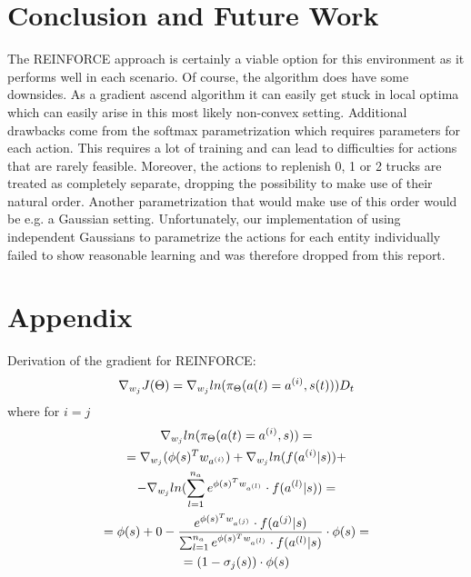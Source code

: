 \documentclass[journal, a4paper]{IEEEtran}
\theoremstyle{plain}
\theoremstyle{definition}
\begin{document}
\section{Conclusion and Future Work}
The REINFORCE approach is certainly a viable option for this environment as it performs well in each scenario. Of course, the algorithm does have some downsides. As a gradient ascend algorithm it can easily get stuck in local optima which can easily arise in this most likely non-convex setting. 
Additional drawbacks come from the softmax parametrization which 
requires parameters for each action. This requires a lot of training and can lead to difficulties for actions that are rarely feasible. Moreover, the actions to replenish 0, 1 or 2 trucks are treated as completely separate, dropping the possibility to make use of their natural order. Another parametrization that would make use of this order would be e.g. a Gaussian setting. 
Unfortunately, our implementation of using independent Gaussians to parametrize the actions for each entity individually failed to show reasonable learning and was therefore dropped from this report.



\section{Appendix}
Derivation of the gradient for REINFORCE:
\begin{align}
	\nabla_{w_j}J(\Theta) = 
\nabla_{w_j} ln(\pi_\Theta(a(t) = a^{(i)},s(t)))D_t
\notag
\end{align}
where for $i = j$ 
\begin{gather}
\nabla_{w_j} ln(\pi_\Theta(a(t) = a^{(i)},s))= 
\notag
\\ 
=\nabla_{w_j} (\phi(s)^T w_{a^{(i)}}) + \nabla_{w_j} ln(f(a^{(i)}|s))
+
\notag
\\
 - 
\nabla_{w_j} ln(\sum_{l=1}^{n_a} e^{\phi(s)^T w_{a^{(l)}}}\cdot f(a^{(l)}|s))=
\notag
\\
=
\phi(s) + 0 - \frac{ e^{\phi(s)^T w_{a^{(j)}}} \cdot f(a^{(j)}|s)}{\sum_{l=1}^{n_a} e^{\phi(s)^T w_{a^{(l)}}}\cdot f(a^{(l)}|s)} \cdot \phi(s)
=
\notag
\\
=(1-\sigma_j(s))\cdot \phi(s)
\end{gather}
\end{document}
